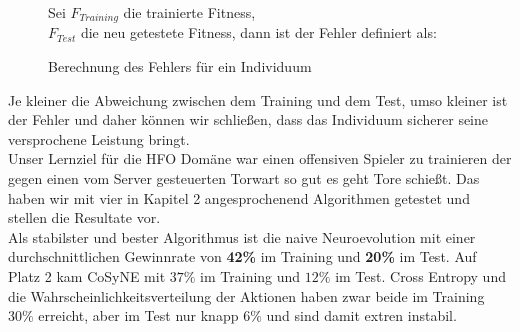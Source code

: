         \begin{figure}[H]
            \begin{mdframed}
                Sei $F_{Training}$ die trainierte Fitness, \\
                \hspace*{4mm} $F_{Test}$ die neu getestete Fitness, dann ist der Fehler definiert als:\\[4mm]
                \hspace*{40mm} 
            \end{mdframed}
            \renewcommand{\figurename}{Definition}
            \caption{Berechnung des Fehlers für ein Individuum}
        \end{figure}

        \noindent
        Je kleiner die Abweichung zwischen dem Training und dem Test, umso kleiner ist der Fehler und daher können wir schließen, dass das Individuum sicherer seine versprochene Leistung bringt.\\

        Unser Lernziel für die HFO Domäne war einen offensiven Spieler zu trainieren der gegen einen vom Server gesteuerten Torwart so gut es geht Tore schießt. Das haben wir mit vier in Kapitel 2 angesprochenend Algorithmen getestet und stellen die Resultate vor. \\[2mm]

        \noindent
        Als stabilster und bester Algorithmus ist die naive Neuroevolution mit einer durchschnittlichen Gewinnrate von \textbf{42\%} im Training und \textbf{20\%} im Test. Auf Platz 2 kam CoSyNE mit $37\%$ im Training und $12\%$ im Test. Cross Entropy und die Wahrscheinlichkeitsverteilung der Aktionen haben zwar beide im Training $30\%$ erreicht, aber im Test nur knapp $6\%$ und sind damit extren instabil.
\newpage
